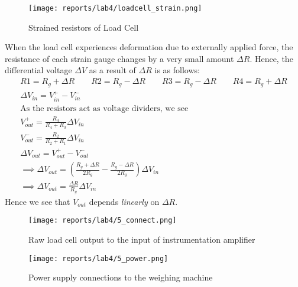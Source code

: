 \documentclass[12pt]{article}
\begin{document}
            \begin{figure}[H]
              \centering
              \texttt{[image: reports/lab4/loadcell\_strain.png]}
              \caption{Strained resistors of Load Cell}
              \label{fig:instru}
            \end{figure}
            \noindent
            When the load cell experiences deformation due to externally applied force, the resistance of each strain gauge changes by a very small amount $\Delta R$. Hence, the differential voltage $\Delta V$ as a result of $\Delta R$ is as follows:
            \newpage
            \begin{gather}
            	R1 = R_g + \Delta R \qquad R2 = R_g - \Delta R \qquad R3 = R_g - \Delta R \qquad R4 = R_g + \Delta R\\
            	\Delta V_{in} = V_{in}^+ - V_{in}^-\\
            	\text{As the resistors act as voltage dividers, we see}\\
            	V_{out}^+ = \frac{R_4}{R_4+R_3} \Delta V_{in}\\
            	V_{out}^- = \frac{R_2}{R_2+R_1} \Delta V_{in}\\
            	\Delta V_{out} = V_{out}^+ - V_{out}^-\\
            	\implies \Delta V_{out} = \left( \frac{R_g + \Delta R}{2R_g} - \frac{R_g - \Delta R}{2R_g} \right)\Delta V_{in}\\
            	\implies \Delta V_{out} = \frac{\Delta R}{R_g}\Delta V_{in}
            \end{gather}
            Hence we see that $V_{out}$ depends \textit{linearly} on $\Delta R$.
        
            \begin{figure}[H]
                \centering
                \texttt{[image: reports/lab4/5\_connect.png]}
                \caption{Raw load cell output to the input of instrumentation amplifier}
            \end{figure}
            
            \begin{figure}[H]
                \centering
                \texttt{[image: reports/lab4/5\_power.png]}
                \caption{Power supply connections to the weighing machine}
            \end{figure}
\end{document}
